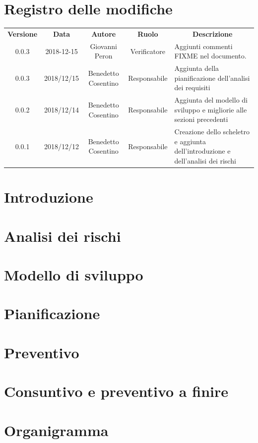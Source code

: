 \documentclass[11pt,a4paper]{article}
\begin{document}
	

	\tableofcontents
	\newpage
	\section*{\centering Registro delle modifiche}
	\begin{tabularx}{\textwidth}{ c | c | c | c | X }
		\rowcolor{LightBlue}
		\color{white}\bfseries Versione & \color{white}\bfseries Data & \color{white}\bfseries Autore & \color{white}\bfseries Ruolo & \multicolumn{1}{c}{\color{white}\bfseries Descrizione}\\[0.25cm]
		0.0.3 & 2018-12-15 & Giovanni Peron & Verificatore & Aggiunti commenti FIXME nel documento.\\
		0.0.3 & 2018/12/15 & Benedetto Cosentino & Responsabile & Aggiunta della pianificazione dell'analisi dei requisiti\\
		0.0.2 & 2018/12/14 & Benedetto Cosentino & Responsabile & Aggiunta del modello di sviluppo e migliorie alle sezioni precedenti\\
		0.0.1 & 2018/12/12 & Benedetto Cosentino & Responsabile & Creazione dello scheletro e aggiunta dell'introduzione e dell'analisi dei rischi\\
	\end{tabularx}

	\newpage	
	\section{Introduzione}
			
		\newpage	
	
	\section{Analisi dei rischi}
		
		\newpage	

	\section{Modello di sviluppo}
		
		\newpage	

	\section{Pianificazione}
		
		
	\section{Preventivo}
%		
		
	\section{Consuntivo e preventivo a finire}
%		

	\appendix
	\section{Organigramma}
%		
\end{document}
